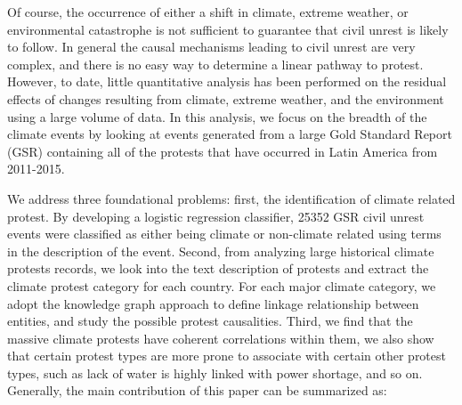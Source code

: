 \documentclass[9pt,twocolumn,twoside]{pnas-new}
\begin{document}
Of course, the occurrence of either a shift in climate, extreme weather, or environmental catastrophe is not sufficient to guarantee that civil unrest is likely to follow.
In general the causal mechanisms leading to civil unrest are very complex, and there is no easy way to determine a linear pathway to protest.
However, to date, little quantitative analysis has been performed on the residual effects of changes resulting from climate, extreme weather, and the environment using a large volume of data. In this analysis, we focus on the breadth of the climate events by looking at events generated from a large Gold Standard Report (GSR) containing all of the protests that have occurred in Latin America from 2011-2015.

We address three foundational problems: first, the identification of climate related protest. By developing a logistic regression classifier, 25352 GSR civil unrest events were classified as either being climate or non-climate related using terms in the description of the event. Second, from analyzing large historical climate protests records, we look into the text description of protests and extract the climate protest category for each country. For each major climate category, we adopt the knowledge graph approach to define linkage relationship between entities, and study the possible protest causalities. Third, we find that the massive climate protests have coherent correlations within them, we also show that certain protest types are more prone to associate with certain other protest types, such as lack of water is highly linked with power shortage, and so on. Generally, the main contribution of this paper can be summarized as:

\end{document}
